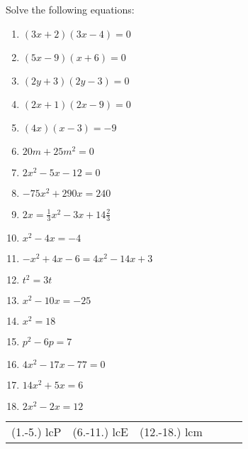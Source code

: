\begin{exercises}{ }
{
Solve the following equations:
\begin{multicols}{2}
\begin{enumerate}[itemsep=5pt, label=\textbf{\arabic*}. ] 
\item  $(3x+2)(3x-4)=0$
\item  $(5x-9)(x+6)=0$
\item  $(2y+3)(2y-3)=0$ 
\item  $(2x+1)(2x-9)=0$    
\item  $(4x)(x-3)=-9$       
\item  $20m+25{m}^{2}=0$
\item  $2{x}^{2}-5x-12=0$  
\item  $-75{x}^{2}+290x=240$
\item  $2x=\frac{1}{3}{x}^{2}-3x+14\frac{2}{3}$
\item  ${x}^{2}-4x=-4$      
\item  $-{x}^{2}+4x-6=4{x}^{2}-14x+3$       
\item  ${t}^{2}=3t$  
\item  ${x}^{2}-10x=-25$      
\item  ${x}^{2}=18$
\item  ${p}^{2}-6p=7$
\item  $4{x}^{2}-17x-77=0$
\item  $14{x}^{2}+5x=6$
\item  $2{x}^{2}-2x=12$              
\end{enumerate}
\end{multicols}
\practiceinfo
\par 
\par\begin{tabular}[h]{cccccc}
(1.-5.) lcP  &  (6.-11.) lcE  &  (12.-18.) lcm \end{tabular}
}
\end{exercises}
